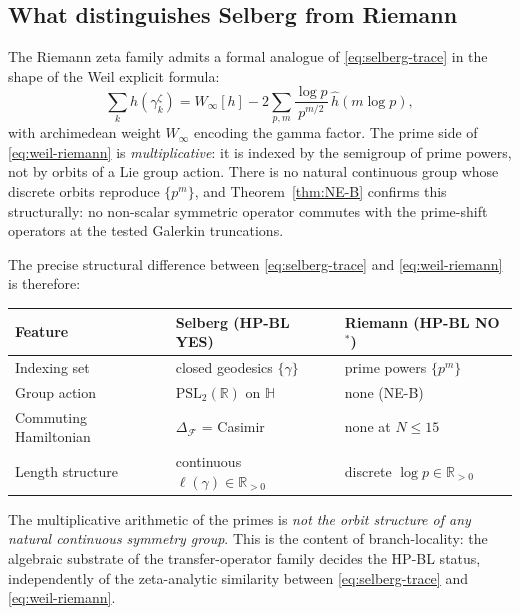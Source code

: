 \documentclass[11pt]{article}
\theoremstyle{definition}
\theoremstyle{remark}
\newcommand{\PSL}{\mathrm{PSL}}
\begin{document}
\subsection{What distinguishes Selberg from Riemann}
\label{sec:selberg-vs-riemann}

The Riemann zeta family admits a formal analogue of
\eqref{eq:selberg-trace} in the shape of the Weil explicit formula:
\begin{equation}
\label{eq:weil-riemann}
  \sum_k h(\gamma_k^\zeta)
  = W_\infty[h]
  - 2\sum_{p,m} \frac{\log p}{p^{m/2}}\,\widehat{h}(m\log p),
\end{equation}
with archimedean weight $W_\infty$ encoding the gamma factor. The
prime side of \eqref{eq:weil-riemann} is \emph{multiplicative}: it is
indexed by the semigroup of prime powers, not by orbits of a Lie
group action. There is no natural continuous group whose discrete
orbits reproduce $\{p^m\}$, and Theorem~\ref{thm:NE-B} confirms
this structurally: no non-scalar symmetric operator commutes with
the prime-shift operators at the tested Galerkin truncations.

The precise structural difference between
\eqref{eq:selberg-trace} and \eqref{eq:weil-riemann} is therefore:
\begin{center}
\begin{tabular}{@{}lll@{}}
\toprule
Feature & Selberg (HP-BL YES) & Riemann (HP-BL NO${}^*$) \\
\midrule
Indexing set & closed geodesics $\{\gamma\}$ &
  prime powers $\{p^m\}$ \\
Group action & $\PSL_2(\mathbb{R})$ on $\mathbb{H}$ & none (NE-B) \\
Commuting Hamiltonian & $\Delta_\mathcal{F}$ = Casimir & none at $N \leq 15$ \\
Length structure & continuous $\ell(\gamma) \in \mathbb{R}_{>0}$ &
  discrete $\log p \in \mathbb{R}_{>0}$ \\
\bottomrule
\end{tabular}
\end{center}

The multiplicative arithmetic of the primes is \emph{not the orbit
structure of any natural continuous symmetry group}. This is the
content of branch-locality: the algebraic substrate of the
transfer-operator family decides the HP-BL status, independently
of the zeta-analytic similarity between \eqref{eq:selberg-trace}
and \eqref{eq:weil-riemann}.

\end{document}

